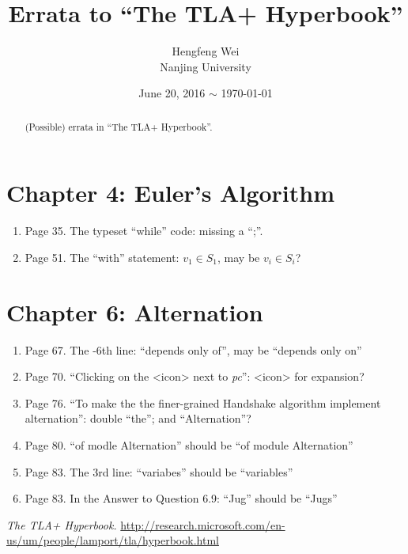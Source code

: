 \documentclass{article}
\title{Errata to ``The TLA+ Hyperbook''}
\author{Hengfeng Wei \\ Nanjing University}
\date{June 20, 2016 $\sim$ \today}
\begin{document}
\maketitle


\begin{abstract}
  (Possible) errata in ``The TLA+ Hyperbook''.
\end{abstract}

\section{Chapter 4: Euler's Algorithm}

\begin{enumerate}
  \item Page 35. The typeset ``while'' code: missing a ``;''.
  \item Page 51. The ``with'' statement: $v_{1} \in S_{1}$, may be $v_{i} \in S_{i}$? 
\end{enumerate}

\section{Chapter 6: Alternation}

\begin{enumerate}
  \item Page 67. The -6th line: ``depends only of'', may be ``depends only on''
  \item Page 70. ``Clicking on the <icon> next to {\it pc}'': <icon> for expansion?
  \item Page 76. ``To make the the finer-grained Handshake algorithm implement alternation'': double ``the''; and ``Alternation''?
  \item Page 80. ``of modle Alternation'' should be ``of module Alternation''
  \item Page 83. The 3rd line: ``variabes'' should be ``variables''
  \item Page 83. In the Answer to Question 6.9: ``Jug'' should be ``Jugs''
\end{enumerate}

\begin{thebibliography}{9}
   \emph{The TLA+ Hyperbook.} \url{http://research.microsoft.com/en-us/um/people/lamport/tla/hyperbook.html}
\end{thebibliography}
\end{document}

